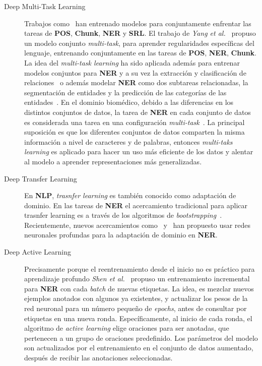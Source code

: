 \begin{description}
	\item[Deep Multi-Task Learning] Trabajos como~\cite{collobert2011natural} han entrenado modelos para conjuntamente enfrentar las tareas de \textbf{POS}, \textbf{Chunk}, \textbf{NER} y \textbf{SRL}. El trabajo de \emph{Yang et al.}~\cite{yang2016multi} propuso un modelo conjunto \emph{multi-task}, para aprender regularidades espec\'ificas del lenguaje, entrenando conjuntamente en las tareas de \textbf{POS}, \textbf{NER}, \textbf{Chunk}. La idea del \emph{multi-task learning} ha sido aplicada adem\'as para entrenar modelos conjuntos para \textbf{NER} y a su vez la extracci\'on y clasificaci\'on de relaciones~\cite{zhou2017joint} o adem\'as modelar \textbf{NER} como dos subtareas relacionadas, la segmentaci\'on de entidades y la predicci\'on de las categor\'ias  de las entidades~\cite{aguilar2019multi}. En el dominio biom\'edico, debido a las diferencias en los distintos conjuntos de datos, la tarea de \textbf{NER} en cada conjunto de datos es considerada una tarea en una configuraci\'on \emph{multi-task}~\cite{wang2019cross}. La principal suposici\'on es que los diferentes conjuntos de datos comparten la misma informaci\'on a nivel de caracteres y de palabras, entonces \emph{multi-taks learning} es aplicado para hacer un uso m\'as eficiente de los datos y alentar al modelo a aprender representaciones m\'as generalizadas.
	
	\item[Deep Transfer Learning] En \textbf{NLP}, \emph{trasnfer learning} es tambi\'en conocido como adaptaci\'on de dominio. En las tareas de \textbf{NER} el acercamiento tradicional para aplicar trasnfer learning es a trav\'es de los algoritmos de \emph{bootstrapping}~\cite{wu2009domain}. Recientemente, nuevos acercamientos como~\cite{lee2017transfer} y~\cite{giorgi2018transfer}  han propuesto usar redes neuronales profundas para la adaptaci\'on de dominio en \textbf{NER}.
	
	\item[Deep Active Learning] Precisamente porque el reentrenamiento desde el inicio no es pr\'actico para aprendizaje profundo \emph{Shen et al.}~\cite{shen2017deep} propuso un entrenamiento incremental para \textbf{NER} con cada \emph{batch} de nuevas etiquetas. La idea, es mezclar nuevos ejemplos anotados con algunos ya existentes, y actualizar los pesos de la red neuronal para un n\'umero peque\~no de \emph{epochs}, antes de consultar por etiquetas en una nueva ronda. Espec\'ificamente, al inicio de cada ronda, el algoritmo de \emph{active learning} elige oraciones para ser anotadas, que pertenecen a un grupo de oraciones predefinido. Los par\'ametros del modelo son actualizados por el entrenamiento en el conjunto de datos aumentado, despu\'es de recibir las anotaciones seleccionadas.
	

\end{description}
